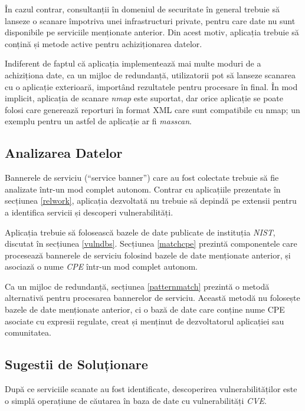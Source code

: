 	În cazul contrar, consultanții în domeniul de securitate în general trebuie să lanseze o scanare împotriva unei infrastructuri private, pentru care date nu sunt disponibile pe serviciile menționate anterior. Din acest motiv, aplicația trebuie să conțină și metode active pentru achiziționarea datelor.
	
	Indiferent de faptul că aplicația implementează mai multe moduri de a achiziționa date, ca un mijloc de redundanță, utilizatorii pot să lanseze scanarea cu o aplicație exterioară, importând rezultatele pentru procesare în final. În mod implicit, aplicația de scanare \textit{nmap} este suportat, dar orice aplicație se poate folosi care generează reporturi în format XML care sunt compatibile cu nmap; un exemplu pentru un astfel de aplicație ar fi \textit{masscan}.

\subsection*{Analizarea Datelor}

	Bannerele de serviciu (``service banner'') care au fost colectate trebuie să fie analizate într-un mod complet autonom. Contrar cu aplicațiile prezentate în secțiunea \ref{relwork}, aplicația dezvoltată nu trebuie să depindă pe extensii pentru a identifica servicii și descoperi vulnerabilități.

	Aplicația trebuie să folosească bazele de date publicate de instituția \textit{NIST}, discutat în secțiunea \ref{vulndbs}. Secțiunea \ref{matchcpe} prezintă componentele care procesează bannerele de serviciu folosind bazele de date menționate anterior, și asociază o nume \textit{CPE} într-un mod complet autonom.

	Ca un mijloc de redundanță, secțiunea \ref{patternmatch} prezintă o metodă alternativă pentru procesarea bannerelor de serviciu. Această metodă nu folosește bazele de date menționate anterior, ci o bază de date care conține nume CPE asociate cu expresii regulate, creat și menținut de dezvoltatorul aplicației sau comunitatea.

\subsection*{Sugestii de Soluționare}

	După ce serviciile scanate au fost identificate, descoperirea vulnerabilităților este o simplă operațiune de căutarea în baza de date cu vulnerabilități \textit{CVE}.
	
